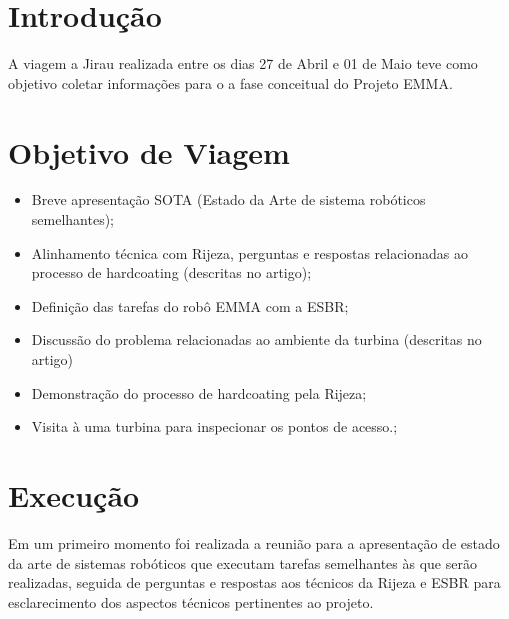 \documentclass[a4paper,11pt,oneside,openany,brazilian,
version=last,draft=false,]{report}
\begin{document}

\begin{twocolumn}




\section*{Introdução}
A viagem a Jirau realizada entre os dias 27 de Abril e 01 de Maio teve como
objetivo coletar informações para o a fase conceitual do Projeto EMMA. 

\section*{Objetivo de Viagem}
\begin{itemize}
  \item Breve apresentação SOTA (Estado da Arte de sistema robóticos
  seme\-lhantes);
  \item Alinhamento técnica com Rijeza, perguntas e respostas relacionadas ao
  processo de hardcoating (descritas no artigo);
\item Definição das tarefas do robô EMMA com a ESBR;
\item Discussão do problema relacionadas ao ambiente da turbina (descritas no
artigo) 
\item Demonstração do processo de hardcoating pela Rijeza;
\item Visita à uma turbina para inspecionar os pontos de acesso.;
\end{itemize}


\section*{Execução}
Em um primeiro momento foi realizada a reunião para a apresentação de estado da
arte de sistemas robóticos que executam tarefas semelhantes às que serão
realizadas, seguida de perguntas e respostas aos técnicos da Rijeza e ESBR para
esclarecimento dos aspectos técnicos pertinentes ao projeto.


\end{twocolumn}
\end{document}
